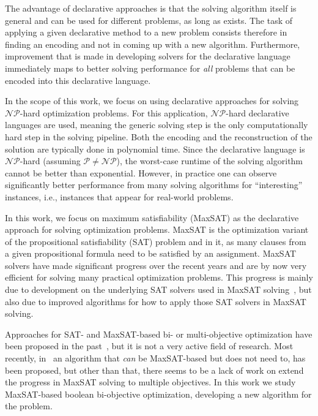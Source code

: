 The advantage of declarative approaches is that the solving algorithm itself is general and can be used for different problems, as long as  exists.
The task of applying a given declarative method to a new problem consists therefore in finding an encoding and not in coming up with a new algorithm.
Furthermore, improvement that is made in developing solvers for the declarative language immediately maps to better solving performance for \emph{all} problems that can be encoded into this declarative language.

In the scope of this work, we focus on using declarative approaches for solving $\mathcal{NP}$-hard optimization problems.
For this application, $\mathcal{NP}$-hard declarative languages are used, meaning the generic solving step is the only computationally hard step in the solving pipeline.
Both the encoding and the reconstruction of the solution are typically done in polynomial time.
Since the declarative language is $\mathcal{NP}$-hard (assuming $\mathcal{P}\neq\mathcal{NP}$), the worst-case runtime of the solving algorithm cannot be better than exponential.
However, in practice one can observe significantly better performance from many solving algorithms for ``interesting'' instances, i.e., instances that appear for real-world problems.


In this work, we focus on maximum satisfiability (MaxSAT) as the declarative approach for solving optimization problems.
MaxSAT is the optimization variant of the propositional satisfiability (SAT) problem and in it, as many clauses from a given propositional formula need to be satisfied by an assignment.
MaxSAT solvers have made significant progress over the recent years and are by now very efficient for solving many practical optimization problems.
This progress is mainly due to development on the underlying SAT solvers used in MaxSAT solving~\autocite{}, but also due to improved algorithms for how to apply those SAT solvers in MaxSAT solving.

Approaches for SAT- and MaxSAT-based bi- or multi-objective optimization have been proposed in the past~\autocite{DBLP:conf/cp/SohBTB17,DBLP:conf/ijcai/Terra-NevesLM18a,DBLP:conf/aaai/Terra-NevesLM18,DBLP:conf/ijcai/Terra-NevesLM18}, but it is not a very active field of research.
Most recently, in~\textcite{DBLP:conf/cp/JanotaMSM21} an algorithm that \emph{can} be MaxSAT-based but does not need to, has been proposed, but other than that, there seems to be a lack of work on extend the progress in MaxSAT solving to multiple objectives.
In this work we study MaxSAT-based boolean bi-objective optimization, developing a new algorithm for the problem.


